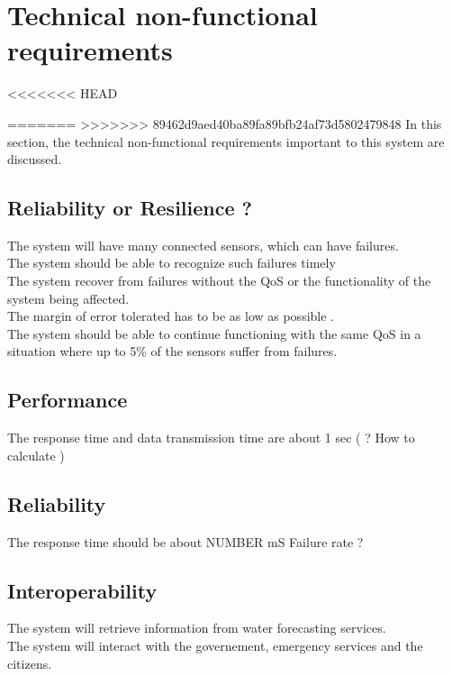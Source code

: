 \section{Technical non-functional requirements}
<<<<<<< HEAD

=======
>>>>>>> 89462d9aed40ba89fa89bfb24af73d5802479848
In this section, the technical non-functional requirements important to this system are discussed.

\subsection{Reliability or Resilience ? }

The system will have many connected sensors, which can have failures. \\
The system should be able to recognize such failures timely \\
The system recover from failures without the QoS or the functionality of the system being affected. \\
The margin of error tolerated has to be as low as possible .\\
The system should be able to continue functioning with the same QoS in a situation where up to 5\% of the sensors suffer from failures. \\ %

\subsection{Performance}
The response time and data transmission time are about 1 sec ( ? How to calculate ) \\

\subsection{Reliability}
The response time should be about NUMBER mS
Failure rate ?

\subsection{Interoperability}
The system will retrieve information from water forecasting services.\\ 
The system will interact with the governement, emergency services and the citizens.\\

